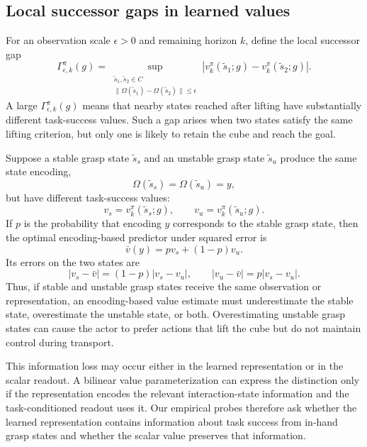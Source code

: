 \subsection{Local successor gaps in learned values}

For an observation scale $\epsilon>0$ and remaining horizon $k$, define the local successor gap
\begin{equation}
    \Gamma^\pi_{\epsilon,k}(g) = \sup_{\substack{ \tilde{s}_1,\tilde{s}_2\in C\\
    \|\Omega(\tilde{s}_1)-\Omega(\tilde{s}_2)\|\leq\epsilon }}
    \left| v_k^\pi(\tilde{s}_1;g) - v_k^\pi(\tilde{s}_2;g) \right|.
    \label{eq:tail_gap}
\end{equation}
A large $\Gamma^\pi_{\epsilon,k}(g)$ means that nearby states reached after lifting have substantially different task-success values.
Such a gap arises when two states satisfy the same lifting criterion, but only one is likely to retain the cube and reach the goal.

Suppose a stable grasp state $\tilde{s}_s$ and an unstable grasp state $\tilde{s}_u$ produce the same state encoding,
\[
    \Omega(\tilde{s}_s)=\Omega(\tilde{s}_u)=y,
\]
but have different task-success values:
\[
    v_s=v_k^\pi(\tilde{s}_s;g), \qquad v_u=v_k^\pi(\tilde{s}_u;g).
\]
If $p$ is the probability that encoding $y$ corresponds to the stable grasp state, then the optimal encoding-based predictor under squared error is
\begin{equation}
    \bar v(y)=p v_s+(1-p)v_u.
\end{equation}
Its errors on the two states are
\begin{equation}
    |v_s-\bar v|=(1-p)|v_s-v_u|, \qquad |v_u-\bar v|=p|v_s-v_u|.
\end{equation}
Thus, if stable and unstable grasp states receive the same observation or representation, an encoding-based value estimate must underestimate the stable state, overestimate the unstable state, or both.
Overestimating unstable grasp states can cause the actor to prefer actions that lift the cube but do not maintain control during transport.

This information loss may occur either in the learned representation or in the scalar readout.
A bilinear value parameterization can express the distinction  only if the representation encodes the relevant interaction-state information and the task-conditioned readout uses it.
Our empirical probes therefore ask whether the learned representation contains information about task success from in-hand grasp states and whether the scalar value preserves that information.

